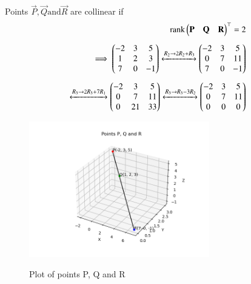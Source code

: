 \documentclass[journal]{IEEEtran}
\begin{document}
Points $\vec{P},\vec{Q} \text{and} \vec{R}$ are collinear if 
\begin{align}
	\text{rank}\begin{pmatrix}\mathbf{P} & \mathbf{Q} & \mathbf{R}\end{pmatrix}^\top = 2\\[5pt]
	\implies \begin{pmatrix}-2 & 3 & 5\\1 & 2 & 3\\7 & 0 & -1\end{pmatrix}\xleftrightarrow[]{R_2 \rightarrow 2R_2 + R_3} \begin{pmatrix}-2 & 3 & 5\\0 & 7 & 11\\7 & 0 & -1\end{pmatrix}\\[5pt]
	\xleftrightarrow[]{R_3 \rightarrow 2R_3 + 7R_1} \begin{pmatrix}-2 & 3 & 5\\0 &7 & 11\\0 & 21 & 33\end{pmatrix} \xleftrightarrow[]{R_3 \rightarrow R_3 - 3R_2} \begin{pmatrix}-2 & 3 & 5\\0 & 7 & 11\\0 & 0 & 0\end{pmatrix}
\end{align}
\newpage
	\begin{figure}[h!]    
	  \begin{center}
		\includegraphics[width=0.7\textwidth]{fig/fig.png}
		\label{Graph}
		  \caption{Plot of points P, Q and R}  
	 \end{center}	  
	\end{figure}
\end{document}

